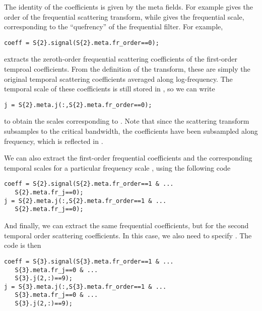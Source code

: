 \documentclass{article}
\begin{document}
The identity of the coefficients is given by the meta fields. For example  gives the order of the frequential scattering transform, while  gives the frequential scale, corresponding to the ``quefrency'' of the frequential filter. For example,
\begin{lstlisting}
coeff = S{2}.signal(S{2}.meta.fr_order==0);
\end{lstlisting}
extracts the zeroth-order frequential scattering coefficients of the first-order temproal coefficients. From the definition of the transform, these are simply the original temporal scattering coefficients averaged along log-frequency. The temporal scale of these coefficients is still stored in , so we can write
\begin{lstlisting}
j = S{2}.meta.j(:,S{2}.meta.fr_order==0);
\end{lstlisting}
to obtain the scales  corresponding to . Note that since the scattering transform subsamples to the critical  bandwidth, the coefficients have been subsampled along frequency, which is reflected in .

We can also extract the first-order frequential coefficients and the corresponding temporal scales  for a particular frequency scale , using the following code
\begin{lstlisting}
coeff = S{2}.signal(S{2}.meta.fr_order==1 & ...
   S{2}.meta.fr_j==0);
j = S{2}.meta.j(:,S{2}.meta.fr_order==1 & ...
   S{2}.meta.fr_j==0);
\end{lstlisting}
And finally, we can extract the same frequential coefficients, but for the second temporal order scattering coefficients. In this case, we also need to specify . The code is then
\begin{lstlisting}
coeff = S{3}.signal(S{3}.meta.fr_order==1 & ...
   S{3}.meta.fr_j==0 & ...
   S{3}.j(2,:)==9);
j = S{3}.meta.j(:,S{3}.meta.fr_order==1 & ...
   S{3}.meta.fr_j==0 & ...
   S{3}.j(2,:)==9);
\end{lstlisting}



\end{document}
